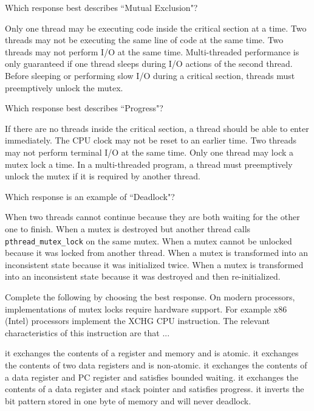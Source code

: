 \variant
Which response best describes ``Mutual Exclusion"?
\begin{answers}
\correctanswer Only one thread may be executing code inside the critical section at a time.
\answer Two threads may not be executing the same line of code at the same time.
\answer Two threads may not perform I/O at the same time.
\answer Multi-threaded performance is only guaranteed if one thread sleeps during I/O actions of the second thread.
\answer Before sleeping or performing slow I/O during a critical section, threads must preemptively unlock the mutex.
\end{answers}
\begin{solution}
\end{solution}


\variant
Which response best describes ``Progress"?
\begin{answers}
\correctanswer If there are no threads inside the critical section, a thread should be able to enter immediately.
\answer The CPU clock may not be reset to an earlier time.
\answer Two threads may not perform terminal I/O at the same time.
\answer Only one thread may lock a mutex lock a time.
\answer In a multi-threaded program, a thread must preemptively unlock the mutex if it is required by another thread.
\end{answers}
\begin{solution}
\end{solution}



\variant
Which response is an example of ``Deadlock"?
\begin{answers}
\correctanswer When two threads cannot continue because they are both waiting for the other one to finish.
\answer When a mutex is destroyed but another thread calls {\tt pthread_mutex_lock} on the same mutex.
\answer When a mutex cannot be unlocked because it was locked from another thread.
\answer When a mutex is transformed into an inconsistent state because it was initialized twice.
\answer When a mutex is transformed into an inconsistent state because it was destroyed and then re-initialized.
\end{answers}
\begin{solution}
\end{solution}


\variant
Complete the following by choosing the best response. On modern processors, implementations of mutex locks require hardware support. For example x86 (Intel) processors implement the XCHG CPU instruction. The relevant characteristics of this instruction are that ...
\begin{answers}
\correctanswer it exchanges the contents of a register and memory and is atomic.
\answer it exchanges the contents of two data registers and is non-atomic.
\answer it exchanges the contents of a data register and PC register and satisfies bounded waiting.
\answer it exchanges the contents of a data register and stack pointer and satisfies progress.
\answer it inverts the bit pattern stored in one byte of memory and will never deadlock.
\end{answers}
\begin{solution}
\end{solution}


